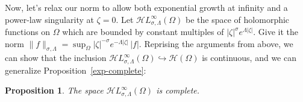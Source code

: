\documentclass{article}
\theoremstyle{plain}
\newtheorem{prop}{Proposition}
\newcommand{\R}{\mathbb{R}}
\newcommand{\C}{\mathbb{C}}
\let\Re\relax
\DeclareMathOperator{\Re}{Re}
\newcommand{\holo}{\mathcal{H}}
\newcommand{\singexp}[2]{\mathcal{H}L^\infty_{#1, #2}}
\newcommand{\holoL}[1]{\mathcal{H}L^{#1}} %
\newcommand{\expHoloL}[2]{\mathcal{H}L^{#1}_{#2}} %
\newenvironment{verify}{\color{ForestGreen}}{\color{black}}
\begin{document}
Now, let's relax our norm to allow both exponential growth at infinity and a power-law singularity at $\zeta = 0$. Let $\singexp{\sigma}{\Lambda}(\Omega)$ be the space of holomorphic functions on $\Omega$ which are bounded by constant multiples of $|\zeta|^\sigma e^{\Lambda|\zeta|}$. Give it the norm $\|f\|_{\sigma,\Lambda} = \sup_\Omega |\zeta|^{-\sigma} e^{-\Lambda|\zeta|}\,|f|$. Reprising the arguments from above, we can show that the inclusion $\singexp{\sigma}{\Lambda}(\Omega) \hookrightarrow \holo(\Omega)$ is continuous, and we can generalize Proposition~\ref{exp-complete}:
\begin{prop}
The space $\singexp{\sigma}{\Lambda}(\Omega)$ is complete.
\end{prop}
\end{document}
